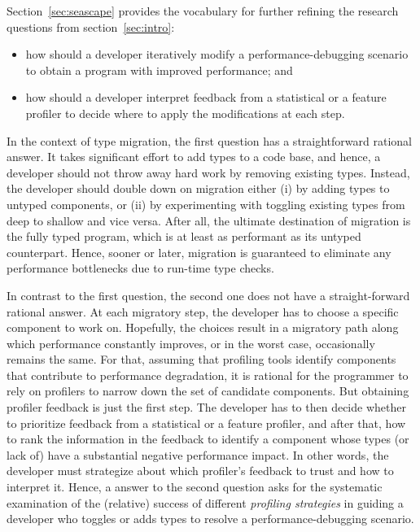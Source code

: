 Section~\ref{sec:seascape} provides the vocabulary for further refining the research
questions from section~\ref{sec:intro}:
\begin{itemize} \em

\item how should a developer iteratively modify a performance-debugging
  scenario to obtain a program with improved performance; and 
    
\item how should a developer interpret feedback from a statistical or a
  feature profiler to decide where to apply the modifications at each
    step.
\end{itemize}   

In the context of type migration, the first question has a straightforward
rational answer. It takes significant effort to add types to a code base,
and hence, a developer should not throw away hard work by removing existing types.
Instead, the developer should double down on migration either (i) by adding
types to untyped components, or (ii) by experimenting with toggling existing
types from deep to shallow and vice versa.   After all, the ultimate
destination of migration is the fully typed program, which is at least as
performant as its untyped counterpart.  Hence, sooner or later,   migration
is guaranteed to eliminate any performance bottlenecks due to run-time type
checks.


In contrast to the first question, the second one does not have a
straight-forward rational answer.  At each migratory step, the developer
has to   choose a specific component to work on.  Hopefully,
the choices result in a migratory path along which performance constantly
improves, or in the worst case, occasionally remains the same. For that, assuming
that profiling tools identify components that contribute to performance
degradation, it is rational for the programmer to rely on profilers to
narrow down the set of candidate components.  But obtaining profiler
feedback is just the first step. The developer has to then decide whether
to prioritize  feedback from a  statistical or a feature profiler, and after that,
how to rank the information in the feedback to identify a component whose
types (or lack of) have a substantial negative performance impact. In
other words, the developer must strategize about which profiler's feedback
to trust and  how to interpret it. Hence, a answer to the second
question asks for the systematic examination of the (relative) success of
different \emph{profiling strategies} in guiding a developer who toggles
or adds types to resolve a  performance-debugging scenario.

